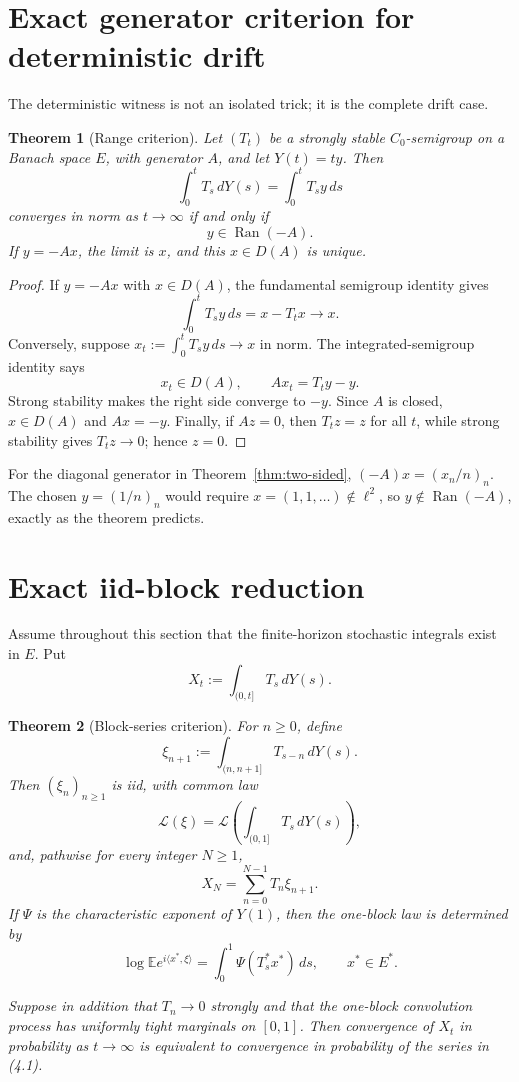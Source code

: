 \documentclass[11pt]{article}
\newtheorem{theorem}{Theorem}
\theoremstyle{remark}
\newcommand{\E}{\mathbb E}
\newcommand{\cL}{\mathcal L}
\newcommand{\Ran}{\operatorname{Ran}}
\begin{document}
\section{Exact generator criterion for deterministic drift}

The deterministic witness is not an isolated trick; it is the complete drift
case.

\begin{theorem}[Range criterion]\label{thm:range}
Let $(T_t)$ be a strongly stable $C_0$-semigroup on a Banach space $E$, with
generator $A$, and let $Y(t)=ty$.  Then
\[
 \int_0^tT_s\,dY(s)=\int_0^tT_sy\,ds
\]
converges in norm as $t\to\infty$ if and only if
\[
 y\in\Ran(-A).
\]
If $y=-Ax$, the limit is $x$, and this $x\in D(A)$ is unique.
\end{theorem}

\begin{proof}
If $y=-Ax$ with $x\in D(A)$, the fundamental semigroup identity gives
\[
 \int_0^tT_sy\,ds=x-T_tx\longrightarrow x.
\]
Conversely, suppose
$x_t:=\int_0^tT_sy\,ds\to x$ in norm.  The integrated-semigroup identity
says
\[
 x_t\in D(A),\qquad Ax_t=T_ty-y.
\]
Strong stability makes the right side converge to $-y$.  Since $A$ is
closed, $x\in D(A)$ and $Ax=-y$.  Finally, if $Az=0$, then $T_tz=z$ for all
$t$, while strong stability gives $T_tz\to0$; hence $z=0$.
\end{proof}

For the diagonal generator in Theorem~\ref{thm:two-sided},
$(-A)x=(x_n/n)_n$.  The chosen $y=(1/n)_n$ would require
$x=(1,1,\ldots)\notin\ell^2$, so $y\notin\Ran(-A)$, exactly as the theorem
predicts.

\section{Exact iid-block reduction}

Assume throughout this section that the finite-horizon stochastic integrals
exist in $E$.  Put
\[
 X_t:=\int_{(0,t]}T_s\,dY(s).
\]

\begin{theorem}[Block-series criterion]\label{thm:block}
For $n\geq0$, define
\[
 \xi_{n+1}:=\int_{(n,n+1]}T_{s-n}\,dY(s).
\]
Then $(\xi_n)_{n\geq1}$ is iid, with common law
\[
 \cL(\xi)=\cL\left(\int_{(0,1]}T_s\,dY(s)\right),
\]
and, pathwise for every integer $N\geq1$,
\[
 X_N=\sum_{n=0}^{N-1}T_n\xi_{n+1}.                 \tag{4.1}
\]
If $\Psi$ is the characteristic exponent of $Y(1)$, then the one-block law
is determined by
\[
 \log\E e^{i\langle x^*,\xi\rangle}
   =\int_0^1\Psi(T_s^*x^*)\,ds,
 \qquad x^*\in E^*.                                \tag{4.2}
\]

Suppose in addition that $T_n\to0$ strongly and that the one-block
convolution process has uniformly tight marginals on $[0,1]$.  Then
convergence of $X_t$ in probability as $t\to\infty$ is equivalent to
convergence in probability of the series in \textup{(4.1)}.
\end{theorem}
\end{document}
